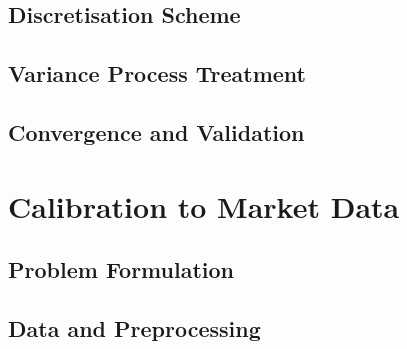 \documentclass[11pt, a4paper]{article}
\numberwithin{equation}{subsection}
\numberwithin{definition}{subsection}
\numberwithin{theorem}{subsection}
\numberwithin{remark}{subsection}
\begin{document}
\subsection{Discretisation Scheme}

\subsection{Variance Process Treatment}

\subsection{Convergence and Validation}


\section{Calibration to Market Data}

\subsection{Problem Formulation}

\subsection{Data and Preprocessing}
\end{document}
